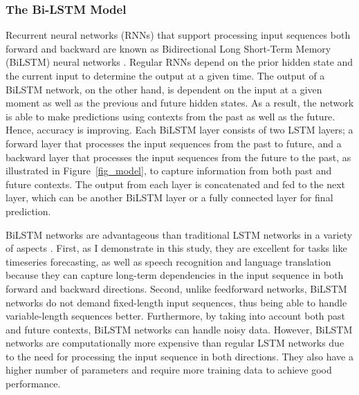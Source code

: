 \subsubsection{The Bi-LSTM Model}
Recurrent neural networks (RNNs) that support processing input sequences both forward and backward are known as Bidirectional Long Short-Term Memory (BiLSTM) neural networks \citep{schuster_1997}. Regular RNNs \citep{hochreiter_1997, kolen_2001} depend on the prior hidden state and the current input to determine the output at a given time. The output of a BiLSTM network, on the other hand, is dependent on the input at a given moment as well as the previous and future hidden states. As a result, the network is able to make predictions using contexts from the past as well as the future. Hence, accuracy is improving.
Each BiLSTM layer consists of two LSTM layers; a forward layer that processes the input sequences from the past to future, and a backward layer that processes the input sequences from the future to the past, as illustrated in Figure~\ref{fig_model}, to capture information from both past and future contexts. The output from each layer is concatenated and fed to the next layer, which can be another BiLSTM layer or a fully connected layer for final prediction.

BiLSTM networks are advantageous than traditional LSTM networks in a variety of aspects \citep{graves_2005, ihianle_2020, alharbi_2021}. First, as I demonstrate in this study, they are excellent for tasks like timeseries forecasting, as well as speech recognition and language translation \citep{wollmer_2013, graves_2014, sundermeyer_2014, huang_2018, nammous_2022} because they can capture long-term dependencies in the input sequence in both forward and backward directions. Second, unlike feedforward networks, BiLSTM networks do not demand fixed-length input sequences, thus being able to handle variable-length sequences better. Furthermore, by taking into account both past and future contexts, BiLSTM networks can handle noisy data.
However, BiLSTM networks are computationally more expensive than regular LSTM networks due to the need for processing the input sequence in both directions. They also have a higher number of parameters and require more training data to achieve good performance.

